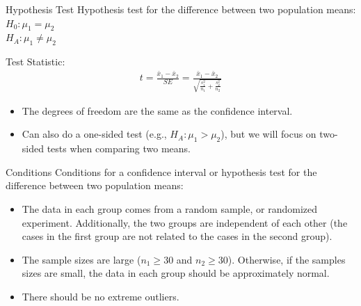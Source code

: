 \documentclass[11pt, fleqn]{beamer}\usepackage[]{graphicx}\usepackage[]{color}
\begin{document}
\begin{frame}{Hypothesis Test}
Hypothesis test for the difference between two population means:\\
\vspace{5pt}
$H_0: \mu_1 = \mu_2$\\ 
\vspace{5pt}
$H_A: \mu_1 \neq \mu_2$\\ 
\vspace{15pt}

Test Statistic:
\begin{align*}
t = \frac{\bar{x}_1 - \bar{x}_2}{SE} = \frac{\bar{x}_1 - \bar{x}_2}{\sqrt{\frac{s_1^2}{n_1} + \frac{s_2^2}{n_2}}}
\end{align*}

\small
\begin{itemize}
\item The degrees of freedom are the same as the confidence interval.
\item Can also do a one-sided test (e.g., $H_A: \mu_1 > \mu_2$), but we will focus on two-sided tests when comparing two means.
\end{itemize}
\end{frame}

\begin{frame}{Conditions}
Conditions for a confidence interval or hypothesis test for the difference between two population means:
\vspace{5pt}
\begin{itemize}
\item The data in each group comes from a random sample, or randomized experiment.  Additionally,  the two groups are independent of each other (the cases in the first group are not related to the cases in the second group).
\vspace{5pt}
\item The sample sizes are large ($n_1 \geq 30$ and $n_2 \geq 30$).  Otherwise, if the samples sizes are small, the data in each group should be approximately normal.
\vspace{5pt}
\item There should be no extreme outliers.
\end{itemize}
\end{frame}
\end{document}
